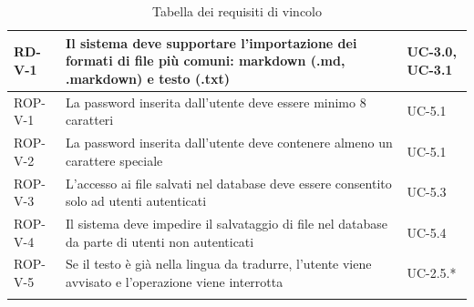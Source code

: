 \documentclass[11pt,a4paper]{article}
\begin{document}
\begin{longtable}{|p{}|>{\raggedright\arraybackslash}p{}|p{}|}
\hline
RD-V-1 & Il sistema deve supportare l'importazione dei formati di file più comuni: markdown (.md, .markdown) e testo (.txt) & UC-3.0, UC-3.1 \\
\hline
ROP-V-1 & La password inserita dall'utente deve essere minimo 8 caratteri & UC-5.1 \\
\hline
ROP-V-2 & La password inserita dall'utente deve contenere almeno un carattere speciale & UC-5.1 \\
\hline
ROP-V-3 & L'accesso ai file salvati nel database deve essere consentito solo ad utenti autenticati & UC-5.3 \\
\hline
ROP-V-4 & Il sistema deve impedire il salvataggio di file nel database da parte di utenti non autenticati & UC-5.4 \\
\hline
ROP-V-5 & Se il testo è già nella lingua da tradurre, l'utente viene avvisato e l'operazione viene interrotta & UC-2.5.* \\
\hline
\addlinespace[1em]
\caption{Tabella dei requisiti di vincolo}
\end{longtable}


\newpage
\end{document}
